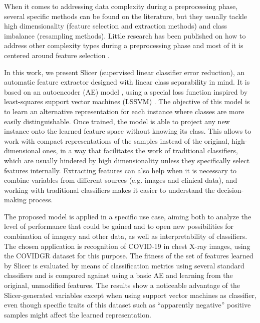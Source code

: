 \documentclass[
	fontsize=11pt, %
	twoside=false, %
	open=any, %
	secnumdepth=1, %
]{kaobook}
\begin{document}
When it comes to addressing data complexity during a preprocessing \cite{garcia2015data} phase, several specific methods can be found on the literature, but they usually tackle high dimensionality (feature selection and extraction methods) and class imbalance (resampling methods). Little research has been published on how to address other complexity types during a preprocessing phase and most of it is centered around feature selection \cite{zhang2013divergence,wang2008feature}.

In this work, we present Slicer (supervised linear classifier error reduction), an automatic feature extractor designed with linear class separability in mind. It is based on an autoencoder (AE) model \cite{charte-tutorial}, using a special loss function inspired by least-squares support vector machines (LSSVM) \cite{suykens1999least}. The objective of this model is to learn an alternative representation for each instance where classes are more easily distinguishable. Once trained, the model is able to project any new instance onto the learned feature space without knowing its class. This allows to work with compact representations of the samples instead of the original, high-dimensional ones, in a way that facilitates the work of traditional classifiers, which are usually hindered by high dimensionality \cite{aggarwal2001surprising,beyer1999nearest} unless they specifically select features internally. Extracting features can also help when it is necessary to combine variables from different sources (e.g. images and clinical data), and working with traditional classifiers makes it easier to understand the decision-making process.

The proposed model is applied in a specific use case, aiming both to analyze the level of performance that could be gained and to open new possibilities for combination of imagery and other data, as well as interpretability of classifiers. The chosen application is recognition of COVID-19 in chest X-ray images, using the COVIDGR dataset \cite{9254002} for this purpose. The fitness of the set of features learned by Slicer is evaluated by means of classification metrics using several standard classifiers and is compared against using a basic AE and learning from the original, unmodified features. The results show a noticeable advantage of the Slicer-generated variables except when using support vector machines as classifier, even though specific traits of this dataset such as ``apparently negative'' positive samples might affect the learned representation.
\end{document}
